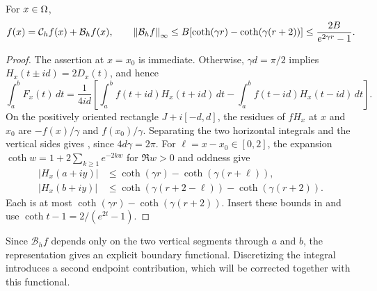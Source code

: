 \begin{lemma}
\label{lem:finite-rep}
For $x\in\Omega$,
\begin{equation}
 f(x)=\mathcal C_hf(x)+\mathcal B_hf(x),\qquad
 \left\lVert \mathcal B_hf\right\rVert_\infty
 \le B[\coth(\gamma r)-\coth(\gamma(r+2))]
 \le\frac{2B}{e^{2\gamma r}-1}.
 \label{eq:finite-rep}
\end{equation}
\end{lemma}
\begin{proof}
The assertion at $x=x_0$ is immediate. Otherwise, $\gamma d=\pi/2$ implies
$H_x(t\pm id)=2D_x(t)$, and hence
\[
 \int_a^bF_x(t)\,dt=\frac1{4id}\left[
 \int_a^b f(t+id)H_x(t+id)\,dt-
 \int_a^b f(t-id)H_x(t-id)\,dt\right].
\]
On the positively oriented rectangle $J+i[-d,d]$, the residues of $fH_x$
at $x$ and $x_0$ are $-f(x)/\gamma$ and $f(x_0)/\gamma$.
Separating the two horizontal integrals and the vertical sides gives
, since $4d\gamma=2\pi$.
For $\ell=x-x_0\in[0,2]$, the expansion
$\coth w=1+2\sum_{k\ge1}e^{-2kw}$ for $\Re w>0$ and oddness give
\begin{align*}
 |H_x(a+iy)|&\le\coth(\gamma r)-\coth(\gamma(r+\ell)),\\
 |H_x(b+iy)|&\le\coth(\gamma(r+2-\ell))-\coth(\gamma(r+2)).
\end{align*}
Each is at most $\coth(\gamma r)-\coth(\gamma(r+2))$.
Insert these bounds in  and use
$\coth t-1=2/(e^{2t}-1)$.
\end{proof}
Since $\mathcal B_h f$ depends only on the two vertical segments through
$a$ and $b$, the representation gives an explicit boundary functional.
Discretizing the integral introduces a second endpoint contribution, which
will be corrected together with this functional.

